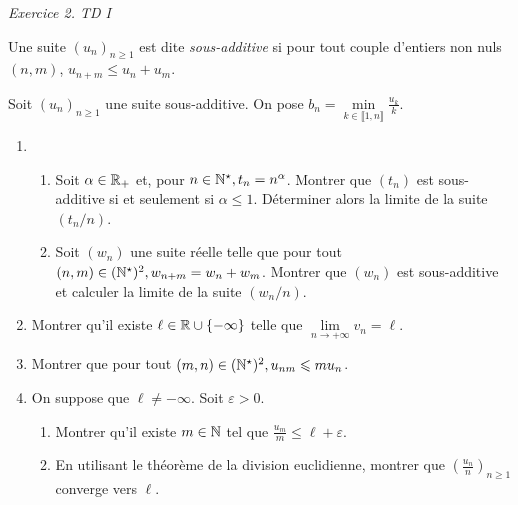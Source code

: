 \emph{Exercice 2. TD I \cite{acamanes}}\\

\begin{defi}
    Une suite $(u_n)_{n\geqslant1}$ est dite \emph{sous-additive} si pour tout couple d'entiers non nuls $(n, m)$, $u_{n+m} \leqslant u_n + u_m$.
\end{defi}

\begin{exercice}
    Soit $(u_n)_{n \geqslant 1}$ une suite sous-additive. On pose $b_n = \min\limits_{k \in \llbracket 1, n \rrbracket} \frac{u_k}{k}$.
    \begin{enumerate}
        \item \begin{enumerate}
            \item Soit $\alpha \in \mathbb{R}_+$ et, pour $n \in \mathbb{N}^\star, t_n = n^{\alpha}$. Montrer que $(t_n)$ est sous-additive si et seulement si $\alpha \leqslant 1$. Déterminer alors la limite de la suite $(t_n/n)$.
            \item Soit $(w_n)$ une suite réelle telle que pour tout $(n,m) \in (\mathbb{N}^\star)^2, w_{n+m} = w_n + w_m$. Montrer que $(w_n)$ est sous-additive et calculer la limite de la suite $(w_n / n)$.
        \end{enumerate}
        \item Montrer qu'il existe $\ell \in \mathbb{R} \cup \{ - \infty \}$ telle que $\lim\limits_{n \to +\infty} v_n = \ell$.
        \item Montrer que pour tout $(m,n) \in (\mathbb{N}^\star)^2, u_{nm} \leqslant m u_n$.
        \item On suppose que $\ell \not= - \infty$. Soit $\varepsilon > 0$.
        \begin{enumerate}
            \item Montrer qu'il existe $m \in \mathbb{N}$ tel que $\frac{u_m}{m} \leqslant \ell + \varepsilon$. 
            \item En utilisant le théorème de la division euclidienne, montrer que $\left( \frac{u_n}{n} \right)_{n \geqslant 1}$ converge vers $\ell$.
        \end{enumerate}
    \end{enumerate}
\end{exercice}


